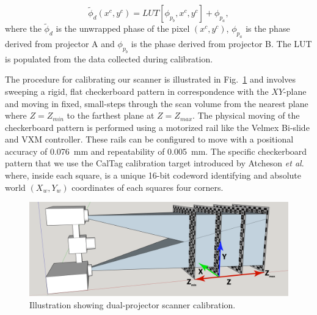 \documentclass[]{spie}  %
\begin{document}
\begin{equation} \label{eq:1.16}
  	\tilde{\phi}_d(x^c, y^c) = LUT[\phi_{p_b}, x^c, y^c] + \phi_{p_a},
  \end{equation}
where the $\tilde{\phi}_d$ is the unwrapped phase of the pixel $(x^c, y^c)$, $\phi_{p_a}$ is the phase derived from projector A and $\phi_{p_b}$ is the phase derived from projector B.
The LUT is populated from the data collected during calibration.

The procedure for calibrating our scanner is illustrated in Fig.~\ref{Fig:20} and involves sweeping a rigid, flat checkerboard pattern in correspondence with the $XY$-plane and moving in fixed, small-steps through the scan volume from the nearest plane where $Z = Z_{min}$ to the farthest plane at $Z = Z_{max}$.  The physical moving of the checkerboard pattern is performed using a motorized rail like the Velmex Bi-slide and VXM controller.  These rails can be configured to move with a positional accuracy of 0.076~mm and repeatability of 0.005~mm.  The specific checkerboard pattern that we use the CalTag calibration target introduced by Atcheson \textit{et al}.~\cite{atch10} where, inside each square, is a unique 16-bit codeword identifying and absolute world $(X_w,Y_w)$ coordinates of each squares four corners.

\begin{figure}[!t]
\centerline{\includegraphics[width=6.6in]{Figures/SLICalibrationDual}}
\vspace{0.1in}
\caption{Illustration showing dual-projector scanner calibration.}
\label{Fig:20}
\end{figure} 
\end{document}
